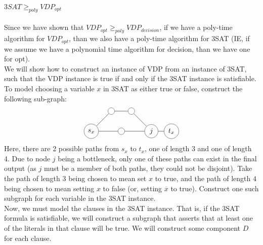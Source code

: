 \documentclass[letterpaper,notitlepage,twoside]{article}
\begin{document}
$3SAT \geq _{poly} VDP_{opt}$\\\\
Since we have shown that $VDP_{opt} \geq _{poly} VDP_{decision}$, if we have a poly-time algorithm for $VDP_{opt}$, than we also have a poly-time algorithm for 3SAT (IE, if we assume we have a polynomial time algorithm for decision, than we have one for opt). \\
We will show how to construct an instance of VDP from an instance of 3SAT, such that the VDP instance is true if and only if the 3SAT instance is satisfiable. To model choosing a variable $x$ in 3SAT as either true or false, construct the following sub-graph: \\
$$\begin{tikzpicture}
    \node[circle,draw=black!80] (a) at (0, 1) {$s_x$};
    \node[circle,draw=black!80] (b) at (1, 2) {};
    \node[circle,draw=black!80] (c) at (2, 2) {};
    \node[circle,draw=black!80] (d) at (1.5, 1) {};
    \node[circle,draw=black!80] (e) at (3, 1) {$j$};
    \node[circle,draw=black!80] (f) at (4, 1) {$t_x$};
    \draw (a) -- (b) -- (c) -- (e) -- (f);
    \draw (a) -- (d) -- (e);
\end{tikzpicture}$$
Here, there are 2 possible paths from $s_x$ to $t_x$, one of length 3 and one of length 4. Due to node $j$ being a bottleneck, only one of these paths can exist in the final output (as $j$ must be a member of both paths, they could not be disjoint). Take the path of length 3 being chosen to mean set $x$ to true, and the path of length $4$ being chosen to mean setting $x$ to false (or, setting $\overline x$ to true). Construct one such subgraph for each variable in the 3SAT instance. \\
Now, we must model the clauses in the 3SAT instance. That is, if the 3SAT formula is satisfiable, we will construct a subgraph that asserts that at least one of the literals in that clause will be true. We will construct some component $D$ for each clause. 
\end{document}
